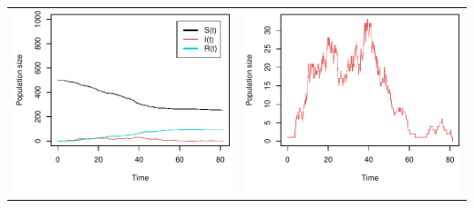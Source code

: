 \documentclass{standalone}
\begin{document}
\begin{tabular}{cc}
\includegraphics[width=9cm]{figure1_1.pdf} & \includegraphics[width=9cm]{figure1_1_I(t).pdf}
\end{tabular}
\end{document}
